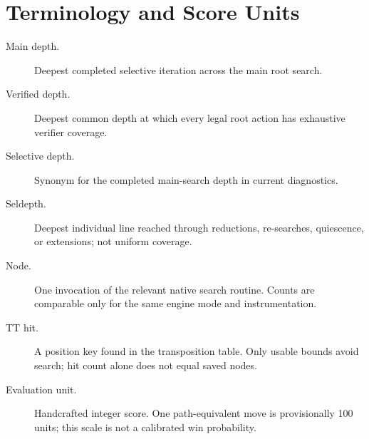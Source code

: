 \section{Terminology and Score Units}
\begin{description}
\item[Main depth.] Deepest completed selective iteration across the main root search.
\item[Verified depth.] Deepest common depth at which every legal root action has exhaustive verifier coverage.
\item[Selective depth.] Synonym for the completed main-search depth in current diagnostics.
\item[Seldepth.] Deepest individual line reached through reductions, re-searches, quiescence, or extensions; not uniform coverage.
\item[Node.] One invocation of the relevant native search routine. Counts are comparable only for the same engine mode and instrumentation.
\item[TT hit.] A position key found in the transposition table. Only usable bounds avoid search; hit count alone does not equal saved nodes.
\item[Evaluation unit.] Handcrafted integer score. One path-equivalent move is provisionally 100 units; this scale is not a calibrated win probability.
\end{description}
